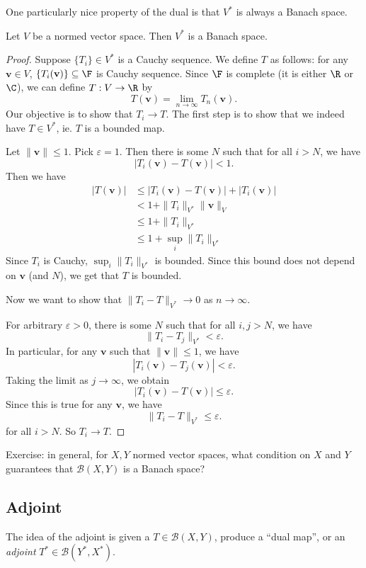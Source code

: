 \documentclass[a4paper]{article}
\begin{document}
One particularly nice property of the dual is that $V^*$ is always a Banach space.

\begin{prop}
  Let $V$ be a normed vector space. Then $V^*$ is a Banach space.
\end{prop}

\begin{proof}
  Suppose $\{T_i\} \in V^*$ is a Cauchy sequence. We define $T$ as follows: for any $\mathbf{v}\in V$, $\{T_i(\mathbf{v})\}\subseteq \F$ is Cauchy sequence. Since $\F$ is complete (it is either $\R$ or $\C$), we can define $T: V\to \R$ by
  \[
    T(\mathbf{v}) = \lim_{n \to \infty}T_n (\mathbf{v}).
  \]
  Our objective is to show that $T_i \to T$. The first step is to show that we indeed have $T \in V^*$, ie. $T$ is a bounded map.

  Let $\|\mathbf{v}\| \leq 1$. Pick $\varepsilon = 1$. Then there is some $N$ such that for all $i > N$, we have
  \[
    |T_i(\mathbf{v}) - T(\mathbf{v})| < 1.
  \]
  Then we have
  \begin{align*}
    |T(\mathbf{v})| &\leq |T_i(\mathbf{v}) - T(\mathbf{v})| + |T_i(\mathbf{v})| \\
    &< 1 + \|T_i\|_{V^*}\|\mathbf{v}\|_V\\
    & \leq 1 + \|T_i\|_{V^*}\\
    &\leq 1 + \sup_i \|T_i\|_{V^*}
  \end{align*}
  Since $T_i$ is Cauchy, $\sup_i \|T_i\|_{V^*}$ is bounded. Since this bound does not depend on $\mathbf{v}$ (and $N$), we get that $T$ is bounded.

  Now we want to show that $\|T_i - T\|_{V^*} \to 0$ as $n\to \infty$.

  For arbitrary $\varepsilon > 0$, there is some $N$ such that for all $i, j > N$, we have
  \[
    \|T_i - T_j\|_{V^*} < \varepsilon.
  \]
  In particular, for any $\mathbf{v}$ such that $\|\mathbf{v}\| \leq 1$, we have
  \[
    |T_i(\mathbf{v}) - T_j(\mathbf{v})| < \varepsilon.
  \]
  Taking the limit as $j\to \infty$, we obtain
  \[
    |T_i(\mathbf{v}) - T(\mathbf{v})| \leq \varepsilon.
  \]
  Since this is true for any $\mathbf{v}$, we have
  \[
    \|T_i - T\|_{V^*} \leq \varepsilon.
  \]
  for all $i > N$. So $T_i \to T$.
\end{proof}
Exercise: in general, for $X, Y$ normed vector spaces, what condition on $X$ and $Y$ guarantees that $\mathcal{B}(X, Y)$ is a Banach space?

\subsection{Adjoint}
The idea of the adjoint is given a $T\in \mathcal{B}(X, Y)$, produce a ``dual map'', or an \emph{adjoint} $T^*\in \mathcal{B}(Y^*, X^*)$.
\end{document}
